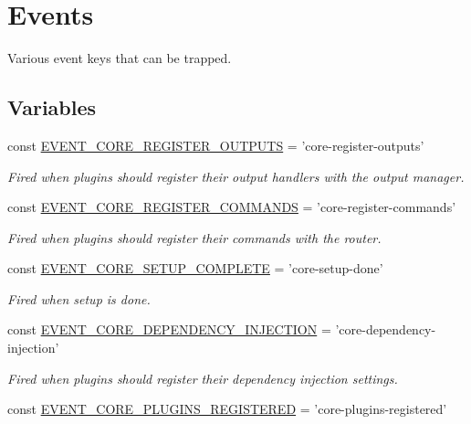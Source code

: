 \hypertarget{group__events}{\section{Events}
\label{group__events}
}


Various event keys that can be trapped.  


\subsection*{Variables}
\begin{DoxyCompactItemize}
\item 
const \hyperlink{group__events_gaac23553a1eec1074d5077678c6a02afc}{E\-V\-E\-N\-T\-\_\-\-C\-O\-R\-E\-\_\-\-R\-E\-G\-I\-S\-T\-E\-R\-\_\-\-O\-U\-T\-P\-U\-T\-S} = 'core-\/register-\/outputs'
\begin{DoxyCompactList}\small\item\em Fired when plugins should register their output handlers with the output manager. \end{DoxyCompactList}\item 
const \hyperlink{group__events_ga1cf767d9d7ceda78534ff850d912e56f}{E\-V\-E\-N\-T\-\_\-\-C\-O\-R\-E\-\_\-\-R\-E\-G\-I\-S\-T\-E\-R\-\_\-\-C\-O\-M\-M\-A\-N\-D\-S} = 'core-\/register-\/commands'
\begin{DoxyCompactList}\small\item\em Fired when plugins should register their commands with the router. \end{DoxyCompactList}\item 
const \hyperlink{group__events_ga87085c0924b7cd74a4cd3902fcd51f48}{E\-V\-E\-N\-T\-\_\-\-C\-O\-R\-E\-\_\-\-S\-E\-T\-U\-P\-\_\-\-C\-O\-M\-P\-L\-E\-T\-E} = 'core-\/setup-\/done'
\begin{DoxyCompactList}\small\item\em Fired when setup is done. \end{DoxyCompactList}\item 
const \hyperlink{group__events_gaac3643817d4679af4e938b5664e3c7b9}{E\-V\-E\-N\-T\-\_\-\-C\-O\-R\-E\-\_\-\-D\-E\-P\-E\-N\-D\-E\-N\-C\-Y\-\_\-\-I\-N\-J\-E\-C\-T\-I\-O\-N} = 'core-\/dependency-\/injection'
\begin{DoxyCompactList}\small\item\em Fired when plugins should register their dependency injection settings. \end{DoxyCompactList}\item 
const \hyperlink{group__events_ga41dac3001e87d8cd46c49e942e3b171c}{E\-V\-E\-N\-T\-\_\-\-C\-O\-R\-E\-\_\-\-P\-L\-U\-G\-I\-N\-S\-\_\-\-R\-E\-G\-I\-S\-T\-E\-R\-E\-D} = 'core-\/plugins-\/registered'

\end{DoxyCompactItemize}
